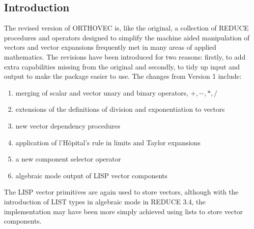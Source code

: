 
\subsection{Introduction}
The revised version of ORTHOVEC\cite{Eastwood:91} is, like the
original\cite{Eastwood:87}, a collection of REDUCE procedures and
operators designed to simplify the machine aided manipulation of vectors
and vector expansions frequently met in many areas of applied mathematics.
The revisions have been introduced for two reasons: firstly, to add extra
capabilities missing from the original and secondly, to tidy up input and
output to make the package easier to use.
\newpage
The changes from Version 1 include:

\begin{enumerate}
\item merging of scalar and vector unary and binary operators, $+, - , *, /
$
\item extensions of the definitions of division and exponentiation 
to vectors
\item new vector dependency procedures
\item application of l'H\^opital's rule in limits and Taylor expansions
\item a new component selector operator
\item algebraic mode output of LISP vector components
\end{enumerate}

The LISP vector primitives are again used to store vectors, although 
with the introduction of LIST types in algebraic mode in REDUCE
3.4, the implementation may have been more simply achieved 
using lists to store vector components.

